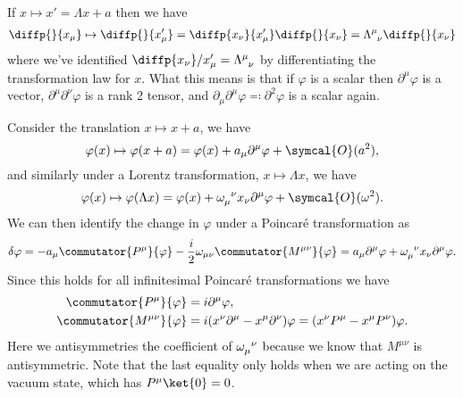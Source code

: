 \documentclass[fleqn]{NotesClass}
\newcommand{\order}{\symcal{O}}
\newcommand{\dalembertian}{\partial^2}
\begin{document}
    If \(x \mapsto x' = \Lambda x + a\) then we have
    \begin{equation}
        \diffp{}{x_\mu} \mapsto \diffp{}{x_\mu'} = \diffp{x_\nu}{x'_\mu} \diffp{}{x_\nu} = \tensor{\Lambda}{^\mu_\nu} \diffp{}{x_\nu}
    \end{equation}
    where we've identified \(\diffp{x_\nu}/{x'_\mu} = \tensor{\Lambda}{^\mu_\nu}\) by differentiating the transformation law for \(x\).
    What this means is that if \(\varphi\) is a scalar then \(\partial^\mu \varphi\) is a vector, \(\partial^\mu \partial^\nu \varphi\) is a rank 2 tensor, and \(\partial_\mu \partial^\mu \varphi \eqqcolon \dalembertian \varphi\) is a scalar again.
    
    Consider the translation \(x \mapsto x + a\), we have
    \begin{equation}
        \varphi(x) \mapsto \varphi(x + a) = \varphi(x) + a_\mu \partial^\mu \varphi + \order(a^2),
    \end{equation}
    and similarly under a Lorentz transformation, \(x \mapsto \Lambda x\), we have
    \begin{equation}
        \varphi(x) \mapsto \varphi(\Lambda x) = \varphi(x) + \tensor{\omega}{_\mu^\nu}x_\nu \partial^\mu \varphi + \order(\omega^2).
    \end{equation}
    We can then identify the change in \(\varphi\) under a Poincar\'e transformation as
    \begin{equation}
        \delta \varphi = -a_\mu \commutator{P^\mu}{\varphi} - \frac{i}{2}\omega_{\mu\nu} \commutator{M^{\mu\nu}}{\varphi} = a_\mu \partial^\mu \varphi + \tensor{\omega}{_\mu^\nu}x_\nu \partial^\mu \varphi.
    \end{equation}
    Since this holds for all infinitesimal Poincar\'e transformations we have
    \begin{align}
        \commutator{P^\mu}{\varphi} &= i\partial^\mu \varphi,\\ \commutator{M^{\mu\nu}}{\varphi} &= i(x^\nu \partial^\mu - x^\mu \partial^\nu) \varphi = (x^\nu P^\mu - x^\mu P^\nu)\varphi.
    \end{align}
    Here we antisymmetries the coefficient of \(\tensor{\omega}{_\mu^\nu}\) because we know that \(M^{\mu\nu}\) is antisymmetric.
    Note that the last equality only holds when we are acting on the vacuum state, which has \(P^\mu \ket{0} = 0\).
    
\end{document}
